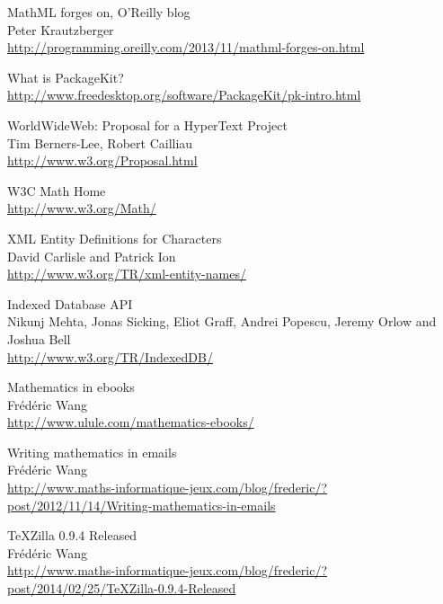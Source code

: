 \begin{thebibliography}{8}
MathML forges on, O'Reilly blog \\
Peter Krautzberger \\
\href{http://programming.oreilly.com/2013/11/mathml-forges-on.html}{http://programming.oreilly.com/2013/11/mathml-forges-on.html}

What is PackageKit? \\
\href{http://www.freedesktop.org/software/PackageKit/pk-intro.html}{http://www.freedesktop.org/software/PackageKit/pk-intro.html}

WorldWideWeb: Proposal for a HyperText Project \\
Tim Berners-Lee, Robert Cailliau \\
\href{http://www.w3.org/Proposal.html}{http://www.w3.org/Proposal.html}

W3C Math Home \\
\href{http://www.w3.org/Math/}{http://www.w3.org/Math/}

XML Entity Definitions for Characters \\
David Carlisle and Patrick Ion \\
\href{http://www.w3.org/TR/xml-entity-names/}{http://www.w3.org/TR/xml-entity-names/}

Indexed Database API \\
Nikunj Mehta, Jonas Sicking, Eliot Graff, Andrei Popescu, Jeremy Orlow and
Joshua Bell \\
\href{http://www.w3.org/TR/IndexedDB/}{http://www.w3.org/TR/IndexedDB/}

Mathematics in ebooks \\
Frédéric Wang \\
\href{http://www.ulule.com/mathematics-ebooks/}{http://www.ulule.com/mathematics-ebooks/}

Writing mathematics in emails \\
Frédéric Wang \\
\href{http://www.maths-informatique-jeux.com/blog/frederic/?post/2012/11/14/Writing-mathematics-in-emails}{http://www.maths-informatique-jeux.com/blog/frederic/?post/2012/11/14/Writing-mathematics-in-emails}

TeXZilla 0.9.4 Released \\
Frédéric Wang \\
\href{http://www.maths-informatique-jeux.com/blog/frederic/?post/2014/02/25/TeXZilla-0.9.4-Released}{http://www.maths-informatique-jeux.com/blog/frederic/?post/2014/02/25/TeXZilla-0.9.4-Released}


\end{thebibliography}
